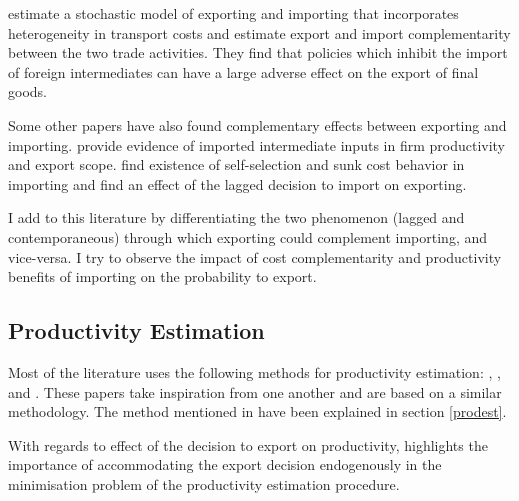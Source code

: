 \documentclass[12pt]{article}
\begin{document}
\textcite{kasahara2013productivity} estimate a stochastic model of
exporting and importing that incorporates heterogeneity in transport
costs and estimate export and import complementarity between the two
trade activities. They find that policies which inhibit the
import of  foreign intermediates can have a large adverse 
effect on the export of final goods.  

Some other papers have also found complementary effects between
exporting and importing. \textcite{vogel2010higher} provide evidence of imported
intermediate inputs in firm productivity and export scope. 
 \textcite{muuls2009imports} find
existence of self-selection and sunk cost behavior in importing and
find an effect of the lagged decision to import on exporting.

I add to this literature by differentiating the two phenomenon (lagged
and contemporaneous) through
which exporting could complement importing, and vice-versa. I try to observe the impact of cost
complementarity and productivity benefits of importing on the
probability to export.  


\subsection*{Productivity Estimation}
Most of the literature uses
the following methods for productivity estimation: 
\textcite{olley1992dynamics}, \textcite{levinsohn2003estimating},
\textcite{ackerberg2006structural} and \textcite{wooldridge2009estimating}. 
These papers take inspiration from one another and are based on a
similar methodology. The method
mentioned in \textcite{olley1992dynamics}
have been explained in section \ref{prodest}.

With regards to effect of the decision to export on productivity, \textcite{de2013detecting} highlights the importance of accommodating
the export decision endogenously in the minimisation problem of the productivity
estimation procedure.
\end{document}
